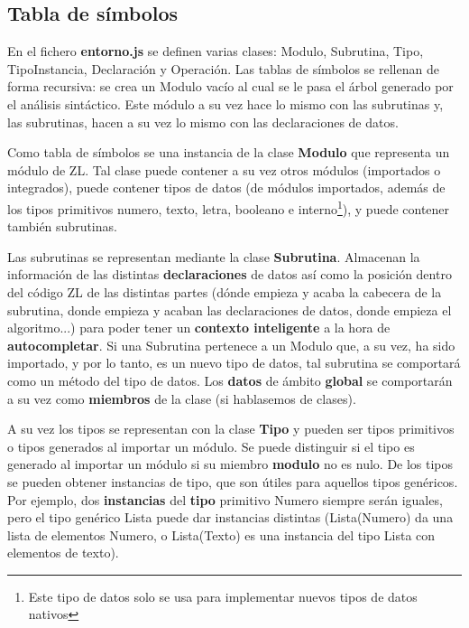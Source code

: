 \documentclass{report}
\begin{document}
	\subsection{Tabla de símbolos}
	
	En el fichero \textbf{entorno.js} se definen varias clases: Modulo, Subrutina, Tipo, TipoInstancia, Declaración y Operación. Las tablas de símbolos se rellenan de forma recursiva: se crea un Modulo vacío al cual se le pasa el árbol generado por el análisis sintáctico. Este módulo a su vez hace lo mismo con las subrutinas y, las subrutinas, hacen a su vez lo mismo con las declaraciones de datos.
	
	\vspace{10px}
	
	Como tabla de símbolos se una instancia de la clase \textbf{Modulo} que representa un módulo de ZL. Tal clase puede contener a su vez otros módulos (importados o integrados), puede contener tipos de datos (de módulos importados, además de los tipos primitivos numero, texto, letra, booleano e interno\footnote{Este tipo de datos solo se usa para implementar nuevos tipos de datos nativos}), y puede contener también subrutinas.
	
	\vspace{10px}
	
	Las subrutinas se representan mediante la clase \textbf{Subrutina}. Almacenan la información de las distintas \textbf{declaraciones} de datos así como la posición dentro del código ZL de las distintas partes (dónde empieza y acaba la cabecera de la subrutina, donde empieza y acaban las declaraciones de datos, donde empieza el algoritmo...) para poder tener un \textbf{contexto inteligente} a la hora de \textbf{autocompletar}. Si una Subrutina pertenece a un Modulo que, a su vez, ha sido importado, y por lo tanto, es un nuevo tipo de datos, tal subrutina se comportará como un método del tipo de datos. Los \textbf{datos} de ámbito \textbf{global} se comportarán a su vez como \textbf{miembros} de la clase (si hablasemos de clases). 
	
	\vspace{10px}
	
	A su vez los tipos se representan con la clase \textbf{Tipo} y pueden ser tipos primitivos o tipos generados al importar un módulo. Se puede distinguir si el tipo es generado al importar un módulo si su miembro \textbf{modulo} no es nulo. De los tipos se pueden obtener instancias de tipo, que son útiles para aquellos tipos genéricos. Por ejemplo, dos \textbf{instancias} del \textbf{tipo} primitivo Numero siempre serán iguales, pero el tipo genérico Lista puede dar instancias distintas (Lista(Numero) da una lista de elementos Numero, o Lista(Texto) es una instancia del tipo Lista con elementos de texto). 
	
\end{document}
